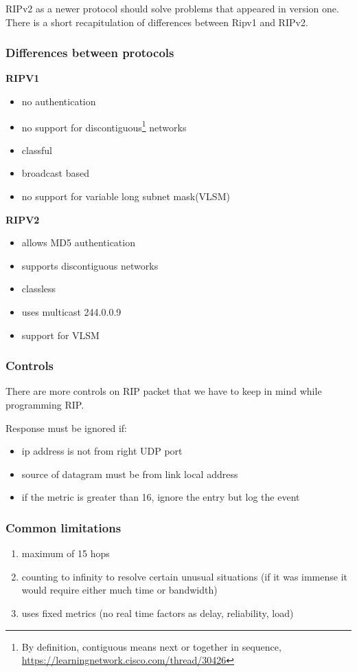 \documentclass[11pt,a4paper]{article}
\begin{document}
\noindent
RIPv2 as a newer protocol should solve problems that appeared in version one. There is a short recapitulation of differences between Ripv1 and RIPv2. 

\subsubsection{Differences between protocols}

\textbf{RIPV1}
\begin{itemize}
\item no authentication
\item no support for discontiguous\footnote{By definition, contiguous means next or together in sequence, \url{https://learningnetwork.cisco.com/thread/30426}} networks
\item classful
\item broadcast based
\item no support for variable long subnet mask(VLSM)
\end{itemize}

\noindent
\textbf{RIPV2}
\begin{itemize}
\item allows MD5 authentication
\item supports discontiguous networks
\item classless
\item uses multicast 244.0.0.9
\item support for VLSM
\end{itemize}

\subsubsection{Controls}
There are more controls on RIP packet that we have to keep in mind while programming RIP.

\noindent
Response must be ignored if:
\begin{itemize}
\item ip address is not from right UDP port
\item source of datagram must be from link local address
\item if the metric is greater than 16, ignore the entry but log the event
\end{itemize}

\subsubsection{Common limitations}
\begin{enumerate}
\item maximum of 15 hops
\item counting to infinity to resolve certain unusual situations (if it was immense it would require either much time or bandwidth)
\item uses fixed metrics (no real time factors as delay, reliability, load)
\end{enumerate}
\end{document}
